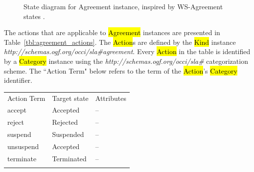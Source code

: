 \documentclass[10pt,a4paper]{article}
\begin{document}
\begin{figure}[!h]
	{\centering {} \par}
	\caption{State diagram for Agreement instance, inspired by WS-Agreement states \cite{ws-agreeement:2007} .}
	\label{fig:agreement-states}
\end{figure}


The actions that are applicable to \hl{Agreement} instances are presented in Table~\ref{tbl:agreement_actions}. The \hl{Action}s are defined by the \hl{Kind} instance \textit{http://schemas.ogf.org/occi/sla\#agreement}. Every \hl{Action} in the table is identified by a \hl{Category} instance using the \textit{http://schemas.ogf.org/occi/sla\#} categorization scheme. The “Action Term" below refers to the term of the \hl{Action}'s \hl{Category} identifier.


{
	\begin{tabular}{lll}
	\toprule
	Action Term & Target state & Attributes \\
	\colrule
	accept & Accepted & -- \\
	reject & Rejected & -- \\
	suspend & Suspended & -- \\
	unsuspend & Accepted & -- \\
	terminate & Terminated & -- \\
	\botrule
	\end{tabular}
}
\end{document}
